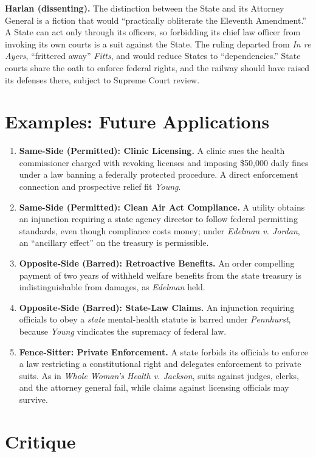 \documentclass[12pt]{article}
\begin{document}
\textbf{Harlan (dissenting).} The distinction between the State and its Attorney General is a fiction that would ``practically obliterate the Eleventh Amendment.'' A State can act only through its officers, so forbidding its chief law officer from invoking its own courts is a suit against the State. The ruling departed from \textit{In re Ayers}, ``frittered away'' \textit{Fitts}, and would reduce States to ``dependencies.'' State courts share the oath to enforce federal rights, and the railway should have raised its defenses there, subject to Supreme Court review.

\section{Examples: Future Applications}

\begin{enumerate}
\item \textbf{Same-Side (Permitted): Clinic Licensing.} A clinic sues the health commissioner charged with revoking licenses and imposing \$50,000 daily fines under a law banning a federally protected procedure. A direct enforcement connection and prospective relief fit \textit{Young}.
\item \textbf{Same-Side (Permitted): Clean Air Act Compliance.} A utility obtains an injunction requiring a state agency director to follow federal permitting standards, even though compliance costs money; under \textit{Edelman v. Jordan}, an ``ancillary effect'' on the treasury is permissible.
\item \textbf{Opposite-Side (Barred): Retroactive Benefits.} An order compelling payment of two years of withheld welfare benefits from the state treasury is indistinguishable from damages, as \textit{Edelman} held.
\item \textbf{Opposite-Side (Barred): State-Law Claims.} An injunction requiring officials to obey a \emph{state} mental-health statute is barred under \textit{Pennhurst}, because \textit{Young} vindicates the supremacy of federal law.
\item \textbf{Fence-Sitter: Private Enforcement.} A state forbids its officials to enforce a law restricting a constitutional right and delegates enforcement to private suits. As in \textit{Whole Woman's Health v. Jackson}, suits against judges, clerks, and the attorney general fail, while claims against licensing officials may survive.
\end{enumerate}

\section{Critique}
\end{document}
